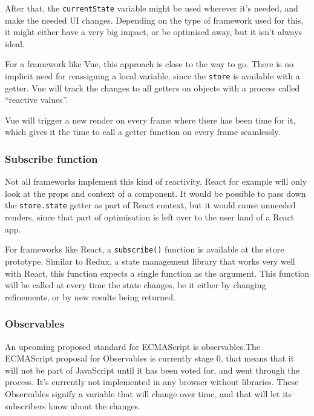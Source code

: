 After that, the {\tt currentState} variable might be used wherever it's needed, and make the needed UI changes. Depending on the type of framework used for this, it might either have a very big impact, or be optimised away, but it isn't always ideal.

For a framework like Vue\cite{vue-reactivity}, this approach is close to the way to go. There is no implicit need for reassigning a local variable, since the {\tt store} is available with a getter. Vue will track the changes to all getters on objects with a process called ``reactive values''.

Vue will trigger a new render on every frame where there has been time for it, which gives it the time to call a getter function on every frame seamlessly. 

\subsubsection{Subscribe function}
\label{ssub:subscribe_function}

Not all frameworks implement this kind of reactivity. React for example will only look at the props and context of a component. It would be possible to pass down the {\tt store.state} getter as part of React context, but it would cause unneeded renders, since that part of optimisation is left over to the user land of a React app. 

For frameworks like React, a {\tt subscribe()} function is available at the store prototype. Similar to Redux\cite{redux-glossary-store}, a state management library that works very well with React, this function expects a single function as the argument. This function will be called at every time the state changes, be it either by changing refinements, or by new results being returned.


\subsubsection{Observables}
\label{ssub:observables}

An upcoming proposed standard for ECMAScript is observables.The ECMAScript proposal for Observables is currently stage 0\cite{tc39-observable}, that means that it will not be part of JavaScript until it has been voted for, and went through the process. It's currently not implemented in any browser without libraries. These Observables signify a variable that will change over time, and that will let its subscribers know about the changes.

